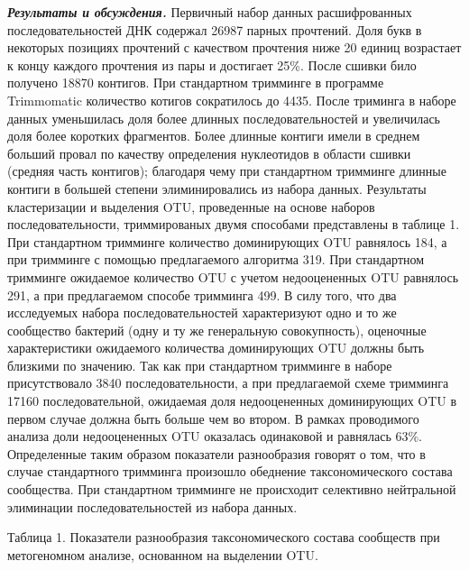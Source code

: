 \documentclass[a4paper,12pt,openany,final]{extreport}
\begin{document}
\emph{\textbf{Результаты и обсуждения.}} Первичный набор данных
расшифрованных последовательностей ДНК содержал 26987 парных прочтений.
Доля букв в некоторых позициях прочтений с качеством прочтения ниже 20
единиц возрастает к концу каждого прочтения из пары и достигает 25\%.
После сшивки било получено 18870 контигов. При стандартном тримминге в
программе Trimmomatic количество котигов сократилось до 4435. После
триминга в наборе данных уменьшилась доля более длинных
последовательностей и увеличилась доля более коротких фрагментов. Более
длинные контиги имели в среднем больший провал по качеству определения
нуклеотидов в области сшивки (средняя часть контигов); благодаря чему
при стандартном тримминге длинные контиги в большей степени
элиминировались из набора данных. Результаты кластеризации и выделения
OTU, проведенные на основе наборов последовательности, триммированых
двумя способами представлены в таблице 1. При стандартном тримминге
количество доминирующих OTU равнялось 184, а при тримминге с помощью
предлагаемого алгоритма 319. При стандартном тримминге ожидаемое
количество OTU с учетом недооцененных OTU равнялось 291, а при
предлагаемом способе тримминга 499. В силу того, что два исследуемых
набора последовательностей характеризуют одно и то же сообщество
бактерий (одну и ту же генеральную совокупность), оценочные
характеристики ожидаемого количества доминирующих OTU должны быть
близкими по значению. Так как при стандартном тримминге в наборе
присутствовало 3840 последовательности, а при предлагаемой схеме
тримминга 17160 последовательной, ожидаемая доля недооцененных
доминирующих OTU в первом случае должна быть больше чем во втором. В
рамках проводимого анализа доли недооцененных OTU оказалась одинаковой и
равнялась 63\%. Определенные таким образом показатели разнообразия
говорят о том, что в случае стандартного тримминга произошло обеднение
таксономического состава сообщества. При стандартном тримминге не
происходит селективно нейтральной элиминации последовательностей из
набора данных.

Таблица 1. Показатели разнообразия таксономического состава сообществ
при метогеномном анализе, основанном на выделении OTU.
\end{document}

